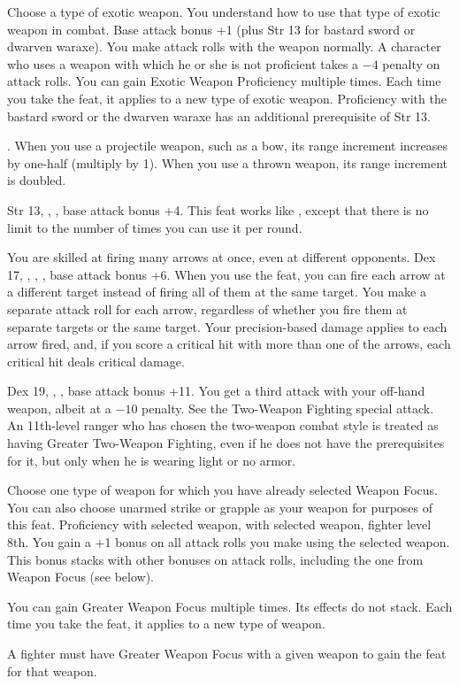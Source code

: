 {Choose a type of exotic weapon. You understand how to use that type of exotic weapon in combat.}
{Base attack bonus +1 (plus Str 13 for bastard sword or dwarven waraxe).}
{You make attack rolls with the weapon normally.}
{A character who uses a weapon with which he or she is not proficient takes a $-4$ penalty on attack rolls.}
{You can gain Exotic Weapon Proficiency multiple times. Each time you take the feat, it applies to a new type of exotic weapon. Proficiency with the bastard sword or the dwarven waraxe has an additional prerequisite of Str 13.}

{.}
{When you use a projectile weapon, such as a bow, its range increment increases by one-half (multiply by 1\onehalf). When you use a thrown weapon, its range increment is doubled.}

{Str 13, , , base attack bonus +4.}
{This feat works like , except that there is no limit to the number of times you can use it per round.}

{You are skilled at firing many arrows at once, even at different opponents.}
{Dex 17, , , , base attack bonus +6.}
{When you use the  feat, you can fire each arrow at a different target instead of firing all of them at the same target. You make a separate attack roll for each arrow, regardless of whether you fire them at separate targets or the same target. Your precision-based damage applies to each arrow fired, and, if you score a critical hit with more than one of the arrows, each critical hit deals critical damage.}{}{}

{}
{Dex 19, , , base attack bonus +11.}
{You get a third attack with your off-hand weapon, albeit at a $-10$ penalty. See the Two-Weapon Fighting special attack.}{}
{An 11th-level ranger who has chosen the two-weapon combat style is treated as having Greater Two-Weapon Fighting, even if he does not have the prerequisites for it, but only when he is wearing light or no armor.}

{Choose one type of weapon for which you have already selected Weapon Focus. You can also choose unarmed strike or grapple as your weapon for purposes of this feat.}
{Proficiency with selected weapon,  with selected weapon, fighter level 8th.}
{You gain a +1 bonus on all attack rolls you make using the selected weapon. This bonus stacks with other bonuses on attack rolls, including the one from Weapon Focus (see below).}{}
{You can gain Greater Weapon Focus multiple times. Its effects do not stack. Each time you take the feat, it applies to a new type of weapon.

A fighter must have Greater Weapon Focus with a given weapon to gain the  feat for that weapon.}

